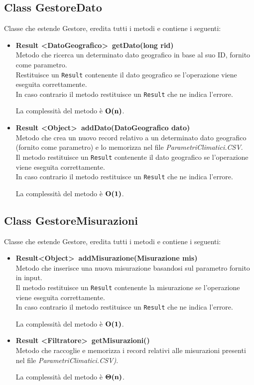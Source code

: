 \documentclass[a4paper, 12pt]{scrreprt}
\begin{document}
			\subsection{Class GestoreDato}
			Classe che estende Gestore, eredita tutti i metodi e contiene i seguenti:
			\begin{itemize}
				\item \textbf{Result \textless DatoGeografico\textgreater~getDato(long rid)}
				\\Metodo che ricerca un determinato dato geografico in base al suo ID, fornito come parametro.
				\\Restituisce un \verb!Result! contenente il dato geografico se l'operazione viene eseguita correttamente.
				\\In caso contrario il metodo restituisce un \verb!Result! che ne indica l'errore.

				La complessit\`a del metodo \`e $\mathbf{O}\textbf{(n)}$.
			\pagebreak
				\item \textbf {Result \textless Object\textgreater~addDato(DatoGeografico dato)}
				\\Metodo che crea un nuovo record relativo a un determinato dato geografico (fornito come parametro) e lo memorizza nel file \textsl{ParametriClimatici.CSV}.
				\\Il metodo restituisce un \verb!Result! contenente il dato geografico se l'operazione viene eseguita correttamente.
				\\In caso contrario il metodo restituisce un \verb!Result! che ne indica l'errore.

				La complessit\`a del metodo \`e $\mathbf{O}\textbf{(1)}$.

			\end{itemize}

			\subsection{Class GestoreMisurazioni}
			Classe che estende Gestore, eredita tutti i metodi e contiene i seguenti:
			\begin{itemize}
				\item \textbf{Result\textless Object\textgreater~addMisurazione(Misurazione mis)}
				\\Metodo che inserisce una nuova misurazione basandosi sul parametro fornito in input.
				\\Il metodo restituisce un \verb!Result! contenente la misurazione se l'operazione viene eseguita correttamente.
				\\In caso contrario il metodo restituisce un \verb!Result! che ne indica l'errore.

				La complessit\`a del metodo \`e $\mathbf{O}\textbf{(1)}$.

				\item \textbf {Result \textless Filtratore\textgreater~getMisurazioni()}
				\\Metodo che raccoglie e memorizza i record relativi alle misurazioni presenti nel file \textsl{ParametriClimatici.CSV)}.

				La complessit\`a del metodo \`e $\mathbf{\Theta}\textbf{(n)}$.

			\end{itemize}
\pagebreak
\end{document}
